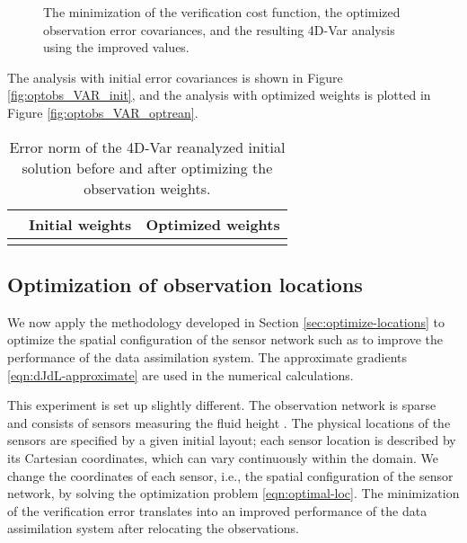 \documentclass{article}
\begin{document}
\begin{figure}
\setcounter{subfigure}{0}
\centering
 \caption{The minimization of the verification cost function, the optimized  observation error covariances, and the resulting 4D-Var analysis
 using the improved values.}
 \label{fig:optobs_OBSVAR}
\end{figure}



The analysis with initial error covariances is shown in Figure \ref{fig:optobs_VAR_init},
and the analysis with optimized weights is plotted in Figure \ref{fig:optobs_VAR_optrean}.



\begin{table}
\caption{Error norm of the 4D-Var reanalyzed initial solution before and after optimizing the observation weights.}
\centering
{
\begin{tabular}{|c||c|c|}
  \hline
  &  Initial weights & Optimized  weights \\
 \hline\hline
 &   & \\
 \hline
\end{tabular}
}
\label{Table:obsopt_gain2}
\end{table}

\subsection{Optimization of observation locations}


We now apply the methodology developed in Section \ref{sec:optimize-locations} to optimize the spatial configuration
of the sensor network such as to improve the performance of the data assimilation system. The approximate
gradients \eqref{eqn:dJdL-approximate} are used in the numerical calculations.

This experiment is set up slightly different. 
The observation network is sparse and consists of  sensors measuring the fluid height .
The physical locations of the sensors are specified by a given initial layout; each sensor location is described by
its Cartesian coordinates, which can vary continuously within the domain.
We change the coordinates of each sensor, i.e., the spatial configuration of the sensor network,
by solving the optimization problem \eqref{eqn:optimal-loc}. The minimization of the verification error
translates into an improved performance of the data assimilation system after relocating the observations.
\end{document}
